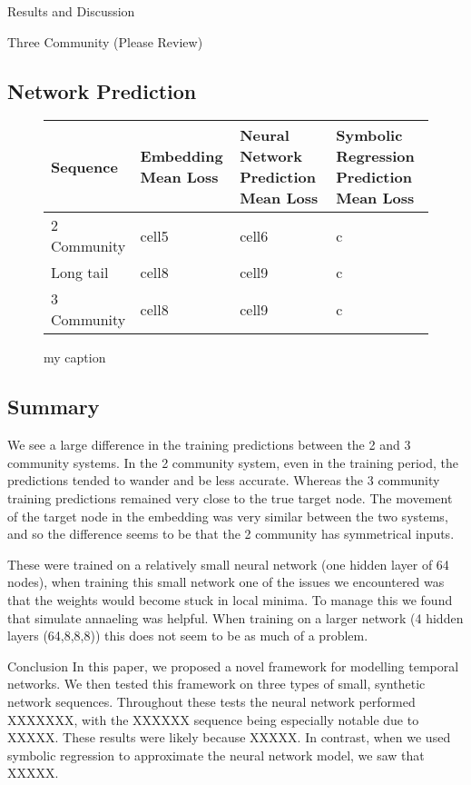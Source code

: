 \documentclass[12pt]{amsart}
\begin{document}
\begin{section}{Results and Discussion}
\begin{subsection}{Three Community (Please Review)}
        \subsection{Network Prediction}
        \begin{figure}
            \begin{center}
                \begin{tabular}{| m{} | m{} | m{} | m{} |}
                 \hline
                 Sequence & Embedding Mean Loss & Neural Network Prediction Mean Loss & Symbolic Regression Prediction Mean Loss\\ 
                 \hline
                 \hline
                 2 Community & cell5 & cell6 & c\\ 
                 \hline 
                 Long tail & cell8 & cell9 & c \\ 
                 \hline 
                 3 Community & cell8 & cell9 & c \\ 
                 \hline 
                \end{tabular}
                \end{center}
                \caption{my caption}
        \end{figure}
        \subsection{Summary}
        We see a large difference in the training predictions between the 2 and 3 community systems. In the 2 community system, even in the training period, the predictions tended to wander and be less accurate. Whereas the 3 community training predictions remained very close to the true target node. The movement of the target node in the embedding was very similar between the two systems, and so the difference seems to be that the 2 community has symmetrical inputs.

        These were trained on a relatively small neural network (one hidden layer of 64 nodes), when training this small network one of the issues we encountered was that the weights would become stuck in local minima. To manage this we found that simulate annaeling was helpful. When training on a larger network (4 hidden layers (64,8,8,8)) this does not seem to be as much of a problem.
    \end{subsection}

\end{section}

\begin{section}{Conclusion}
    In this paper, we proposed a novel framework for modelling temporal networks. We then tested this framework on three types of small, synthetic network sequences. Throughout these tests the neural network performed XXXXXXX, with the XXXXXX sequence being especially notable due to XXXXX. These results were likely because XXXXX. In contrast, when we used symbolic regression to approximate the neural network model, we saw that XXXXX.
\end{section} 



\printbibliography
\end{document}
